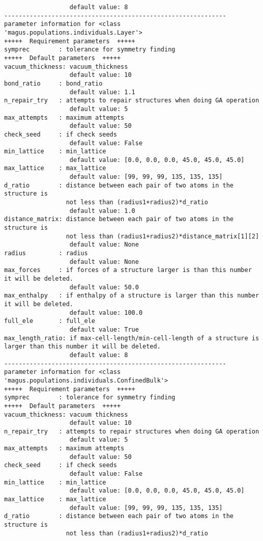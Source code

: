 \documentclass[12pt,oneside]{book}
\begin{document}
\begin{tcolorbox}
\begin{verbatim}
                  default value: 8
-------------------------------------------------------------
parameter information for <class 'magus.populations.individuals.Layer'>
+++++  Requirement parameters  +++++
symprec        : tolerance for symmetry finding
+++++  Default parameters  +++++
vacuum_thickness: vacuum_thickness
                  default value: 10
bond_ratio     : bond_ratio
                  default value: 1.1
n_repair_try   : attempts to repair structures when doing GA operation
                  default value: 5
max_attempts   : maximum attempts
                  default value: 50
check_seed     : if check seeds
                  default value: False
min_lattice    : min_lattice
                  default value: [0.0, 0.0, 0.0, 45.0, 45.0, 45.0]
max_lattice    : max_lattice
                  default value: [99, 99, 99, 135, 135, 135]
d_ratio        : distance between each pair of two atoms in the structure is
                 not less than (radius1+radius2)*d_ratio
                  default value: 1.0
distance_matrix: distance between each pair of two atoms in the structure is
                 not less than (radius1+radius2)*distance_matrix[1][2]
                  default value: None
radius         : radius
                  default value: None
max_forces     : if forces of a structure larger is than this number it will be deleted.
                  default value: 50.0
max_enthalpy   : if enthalpy of a structure is larger than this number it will be deleted.
                  default value: 100.0
full_ele       : full_ele
                  default value: True
max_length_ratio: if max-cell-length/min-cell-length of a structure is larger than this number it will be deleted.
                  default value: 8
-------------------------------------------------------------
parameter information for <class 'magus.populations.individuals.ConfinedBulk'>
+++++  Requirement parameters  +++++
symprec        : tolerance for symmetry finding
+++++  Default parameters  +++++
vacuum_thickness: vacuum thickness
                  default value: 10
n_repair_try   : attempts to repair structures when doing GA operation
                  default value: 5
max_attempts   : maximum attempts
                  default value: 50
check_seed     : if check seeds
                  default value: False
min_lattice    : min_lattice
                  default value: [0.0, 0.0, 0.0, 45.0, 45.0, 45.0]
max_lattice    : max_lattice
                  default value: [99, 99, 99, 135, 135, 135]
d_ratio        : distance between each pair of two atoms in the structure is
                 not less than (radius1+radius2)*d_ratio

\end{verbatim}
\end{tcolorbox}
\end{document}
